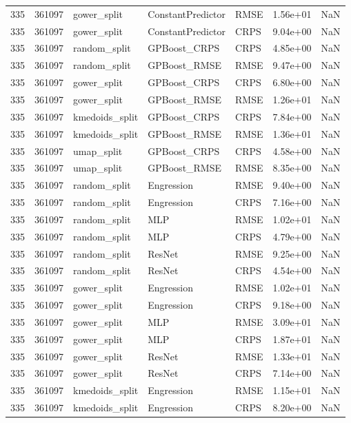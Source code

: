 \begin{tabular}{rrlllrr}
335 & 361097 & gower\_split & ConstantPredictor & RMSE & 1.56e+01 & NaN \\
335 & 361097 & gower\_split & ConstantPredictor & CRPS & 9.04e+00 & NaN \\
335 & 361097 & random\_split & GPBoost\_CRPS & CRPS & 4.85e+00 & NaN \\
335 & 361097 & random\_split & GPBoost\_RMSE & RMSE & 9.47e+00 & NaN \\
335 & 361097 & gower\_split & GPBoost\_CRPS & CRPS & 6.80e+00 & NaN \\
335 & 361097 & gower\_split & GPBoost\_RMSE & RMSE & 1.26e+01 & NaN \\
335 & 361097 & kmedoids\_split & GPBoost\_CRPS & CRPS & 7.84e+00 & NaN \\
335 & 361097 & kmedoids\_split & GPBoost\_RMSE & RMSE & 1.36e+01 & NaN \\
335 & 361097 & umap\_split & GPBoost\_CRPS & CRPS & 4.58e+00 & NaN \\
335 & 361097 & umap\_split & GPBoost\_RMSE & RMSE & 8.35e+00 & NaN \\
335 & 361097 & random\_split & Engression & RMSE & 9.40e+00 & NaN \\
335 & 361097 & random\_split & Engression & CRPS & 7.16e+00 & NaN \\
335 & 361097 & random\_split & MLP & RMSE & 1.02e+01 & NaN \\
335 & 361097 & random\_split & MLP & CRPS & 4.79e+00 & NaN \\
335 & 361097 & random\_split & ResNet & RMSE & 9.25e+00 & NaN \\
335 & 361097 & random\_split & ResNet & CRPS & 4.54e+00 & NaN \\
335 & 361097 & gower\_split & Engression & RMSE & 1.02e+01 & NaN \\
335 & 361097 & gower\_split & Engression & CRPS & 9.18e+00 & NaN \\
335 & 361097 & gower\_split & MLP & RMSE & 3.09e+01 & NaN \\
335 & 361097 & gower\_split & MLP & CRPS & 1.87e+01 & NaN \\
335 & 361097 & gower\_split & ResNet & RMSE & 1.33e+01 & NaN \\
335 & 361097 & gower\_split & ResNet & CRPS & 7.14e+00 & NaN \\
335 & 361097 & kmedoids\_split & Engression & RMSE & 1.15e+01 & NaN \\
335 & 361097 & kmedoids\_split & Engression & CRPS & 8.20e+00 & NaN \\

\end{tabular}
